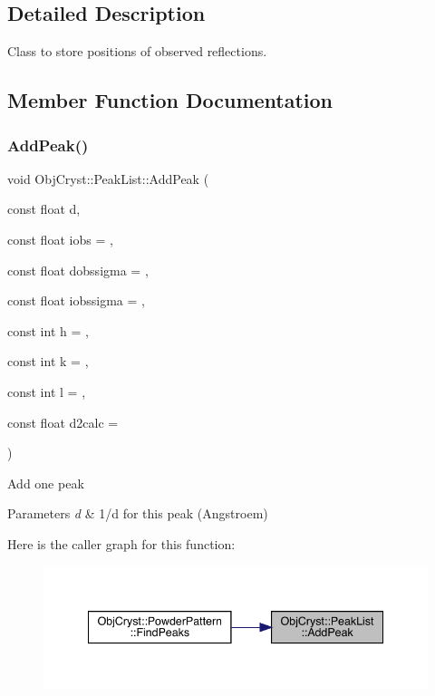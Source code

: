 \subsection{Detailed Description}
Class to store positions of observed reflections. 

\subsection{Member Function Documentation}
\mbox{\label{class_obj_cryst_1_1_peak_list_a825e83f775144bdbe0d558789af02d97}} 
\subsubsection{\texorpdfstring{AddPeak()}{AddPeak()}}
{\footnotesize\ttfamily void Obj\+Cryst\+::\+Peak\+List\+::\+Add\+Peak (\begin{DoxyParamCaption}\item[{const float}]{d,  }\item[{const float}]{iobs = {},  }\item[{const float}]{dobssigma = {},  }\item[{const float}]{iobssigma = {},  }\item[{const int}]{h = {},  }\item[{const int}]{k = {},  }\item[{const int}]{l = {},  }\item[{const float}]{d2calc = {} }\end{DoxyParamCaption})}

Add one peak 
\begin{DoxyParams}{Parameters}
{\em d} & 1/d for this peak (Angstroem) \\
\hline
\end{DoxyParams}
Here is the caller graph for this function\+:
\nopagebreak
\begin{figure}[H]
\begin{center}
\leavevmode
\includegraphics[width=341pt]{class_obj_cryst_1_1_peak_list_a825e83f775144bdbe0d558789af02d97_icgraph}
\end{center}
\end{figure}
\mbox{\label{class_obj_cryst_1_1_peak_list_a88b5e22d20e07c1392b7b3916a9f58fe}} 
